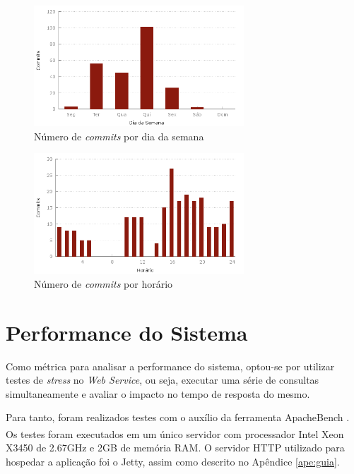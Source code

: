 \begin{figure}[!htb]
	\centering
	\includegraphics[width=0.7\textwidth]{./plots/day_of_week.png}
	\caption[Número de \emph{commits} por dia da semana]{Número de \emph{commits} por dia da semana}
	\label{fig:dayofweek}
\end{figure}

\begin{figure}[!htb]
	\centering
	\includegraphics[width=0.7\textwidth]{./plots/hour_of_day.png}
	\caption[Número de \emph{commits} por horário]{Número de \emph{commits} por horário}
	\label{fig:hourofday}
\end{figure}

\section{Performance do Sistema}
\label{sec:perf}
Como métrica para analisar a performance do sistema, optou-se por utilizar testes de \emph{stress} no \emph{Web Service}, ou seja, executar uma série de consultas simultaneamente e avaliar o impacto no tempo de resposta do mesmo.

Para tanto, foram realizados testes com o auxílio da ferramenta ApacheBench \cite{apachebench}.
Os testes foram executados em um único servidor com processador Intel{\textsuperscript\textregistered} Xeon{\textsuperscript\textregistered} X3450 de 2.67GHz e 2GB de memória RAM.
O servidor HTTP utilizado para hospedar a aplicação foi o Jetty, assim como descrito no Apêndice \ref{ape:guia}.

